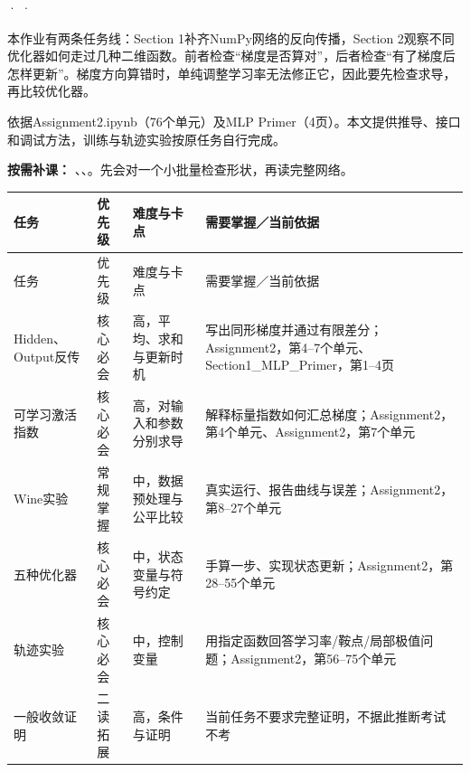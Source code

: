 





 ·  · 


本作业有两条任务线：Section 1补齐NumPy网络的反向传播，Section 2观察不同优化器如何走过几种二维函数。前者检查“梯度是否算对”，后者检查“有了梯度后怎样更新”。梯度方向算错时，单纯调整学习率无法修正它，因此要先检查求导，再比较优化器。


依据Assignment2.ipynb（76个单元）及MLP Primer（4页）。本文提供推导、接口和调试方法，训练与轨迹实验按原任务自行完成。


\textbf{按需补课：} 、、。先会对一个小批量检查形状，再读完整网络。


\begingroup
\small\setlength{\tabcolsep}{3pt}
\renewcommand{\arraystretch}{1.22}
\begin{longtable}{@{}>{\raggedright\arraybackslash}p{}>{\raggedright\arraybackslash}p{}>{\raggedright\arraybackslash}p{}>{\raggedright\arraybackslash}p{}@{}}
\toprule
任务 & 优先级 & 难度与卡点 & 需要掌握／当前依据 \\
\midrule\endfirsthead
任务 & 优先级 & 难度与卡点 & 需要掌握／当前依据 \\
\midrule\endhead
\bottomrule\endfoot
Hidden、Output反传 & 核心必会 & 高，平均、求和与更新时机 & 写出同形梯度并通过有限差分；Assignment2，第4–7个单元、Section1\_MLP\_Primer，第1–4页 \\
可学习激活指数 & 核心必会 & 高，对输入和参数分别求导 & 解释标量指数如何汇总梯度；Assignment2，第4个单元、Assignment2，第7个单元 \\
Wine实验 & 常规掌握 & 中，数据预处理与公平比较 & 真实运行、报告曲线与误差；Assignment2，第8–27个单元 \\
五种优化器 & 核心必会 & 中，状态变量与符号约定 & 手算一步、实现状态更新；Assignment2，第28–55个单元 \\
轨迹实验 & 核心必会 & 中，控制变量 & 用指定函数回答学习率/鞍点/局部极值问题；Assignment2，第56–75个单元 \\
一般收敛证明 & 二读拓展 & 高，条件与证明 & 当前任务不要求完整证明，不据此推断考试不考 \\
\end{longtable}
\endgroup



